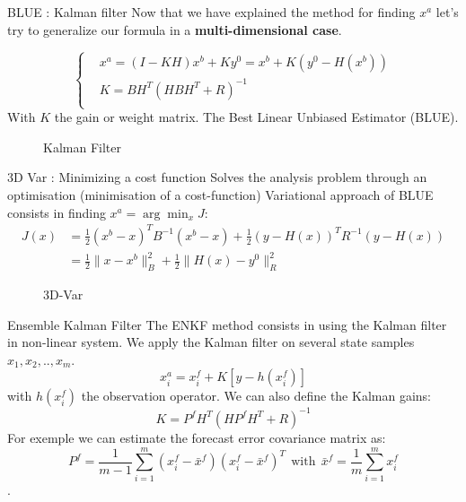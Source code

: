 	\begin{frame}{BLUE : Kalman filter}
       Now that we have explained the method for finding $x^a$ let's try to generalize our formula in a \textbf{multi-dimensional case}.
   
       $$\left\{\begin{aligned}
	     &x^a=(I-KH)x^b+Ky^0=x^b+K(y^0-H(x^b)) \\
	           &K=BH^T(HBH^T+R)^{-1} \\
	    \end{aligned}\right.$$
       With $K$ the gain or weight matrix.
       The Best Linear Unbiased Estimator (BLUE).
       \begin{figure}[H]
           \caption{Kalman Filter}
       \end{figure}
   \end{frame}
   \begin{frame}{3D Var : Minimizing a cost function}
       Solves the analysis problem through an optimisation (minimisation of a cost-function)
       Variational approach of BLUE consists in finding $x^a=\arg\min_{x}J$:
       $$\begin{aligned}
           J(x)&=\frac{1}{2}(x^b-x)^TB^{-1}(x^b-x)+\frac{1}{2}(y-H(x))^TR^{-1}(y-H(x)) \\
           &=\frac{1}{2}\|x-x^b\|_B^2+\frac{1}{2}\|H(x)-y^0\|_R^2
       \end{aligned}$$
       \begin{figure}
           \centering
           \caption{3D-Var}
       \end{figure}
   \end{frame}
   \begin{frame}{Ensemble Kalman Filter}
       The ENKF method consists in using the Kalman filter in non-linear system.
       \newline We apply the Kalman filter on several state samples $x_1,x_2,..,x_{m}$.
       $$x_i^a=x_i^f+K[y-h(x_i^f)]$$
       with $h(x_i^f)$ the observation operator.
       We can also define the Kalman gains: 
       $$K=P^f H^T(HP^f H^T+R)^{-1}$$
       For exemple we can estimate the
       forecast error covariance matrix as:
       $$P^f=\frac{1}{m-1}\sum_{i=1}^{m}(x_i^f-\bar{x}^f)(x_i^f-\bar{x}^f)^T~~\text{with}~~\bar{x}^f=\frac{1}{m}\sum_{i=1}^{m}x_i^f $$ .
   \end{frame}

